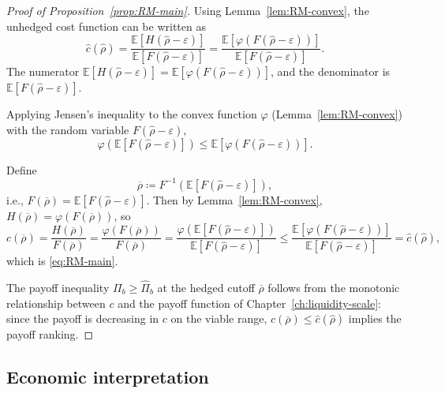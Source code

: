 \documentclass[11pt,a4paper,oneside]{book}
\def\E{\mathbb{E}}
\def\leq{\leqslant}
\def\geq{\geqslant}
\theoremstyle{plain}
\theoremstyle{definition}
\theoremstyle{remark}
\numberwithin{equation}{chapter}
\begin{document}
\begin{proof}[Proof of Proposition~\ref{prop:RM-main}]
Using Lemma~\ref{lem:RM-convex}, the unhedged cost function can be written as
\begin{equation*}
  \widehat{c}(\widehat{\rho}) = \frac{\E[H(\widehat{\rho} - \varepsilon)]}{\E[F(\widehat{\rho} - \varepsilon)]}
  = \frac{\E[\varphi(F(\widehat{\rho} - \varepsilon))]}{\E[F(\widehat{\rho} - \varepsilon)]}.
\end{equation*}
The numerator $\E[H(\widehat{\rho} - \varepsilon)] = \E[\varphi(F(\widehat{\rho} - \varepsilon))]$, and the denominator is $\E[F(\widehat{\rho} - \varepsilon)]$.

Applying Jensen's inequality to the convex function $\varphi$ (Lemma~\ref{lem:RM-convex}) with the random variable $F(\widehat{\rho} - \varepsilon)$,
\begin{equation*}
  \varphi(\E[F(\widehat{\rho} - \varepsilon)]) \leq \E[\varphi(F(\widehat{\rho} - \varepsilon))].
\end{equation*}

Define
\begin{equation}\label{eq:RM-rho-bar}
  \overline{\rho} \coloneqq F^{-1}(\E[F(\widehat{\rho} - \varepsilon)]),
\end{equation}
i.e., $F(\overline{\rho}) = \E[F(\widehat{\rho} - \varepsilon)]$.
Then by Lemma~\ref{lem:RM-convex}, $H(\overline{\rho}) = \varphi(F(\overline{\rho}))$, so
\begin{equation*}
  c(\overline{\rho}) = \frac{H(\overline{\rho})}{F(\overline{\rho})}
  = \frac{\varphi(F(\overline{\rho}))}{F(\overline{\rho})}
  = \frac{\varphi(\E[F(\widehat{\rho} - \varepsilon)])}{\E[F(\widehat{\rho} - \varepsilon)]}
  \leq \frac{\E[\varphi(F(\widehat{\rho} - \varepsilon))]}{\E[F(\widehat{\rho} - \varepsilon)]}
  = \widehat{c}(\widehat{\rho}),
\end{equation*}
which is \eqref{eq:RM-main}.

The payoff inequality $\Pi_b \geq \widehat{\Pi}_b$ at the hedged cutoff $\overline{\rho}$ follows from the monotonic relationship between $c$ and the payoff function of Chapter~\ref{ch:liquidity-scale}: since the payoff is decreasing in $c$ on the viable range, $c(\overline{\rho}) \leq \widehat{c}(\widehat{\rho})$ implies the payoff ranking.
\end{proof}

\subsection{Economic interpretation}
\end{document}
